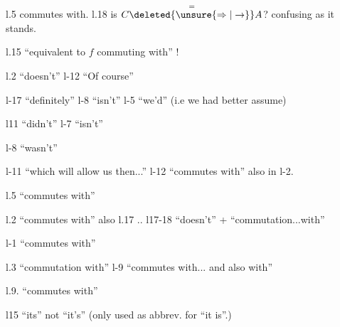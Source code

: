
\begin{minipage}{\linewidth}
\scriptsize
\setlength{\parindent}{0pt}
\setlength{\parskip}{1pt}

\noindent{}l.5 commutes with. l.18 is $C\overset{=}{\deleted{\unsure{\Rightarrow|\to}}}A$? confusing as it stands.

\noindent{}l.15 ``equivalent to $f$ commuting with'' !

\noindent{}l.2 ``doesn't'' l-12 ``Of course''

\noindent{}l-17 ``definitely'' l-8 ``isn't'' l-5 ``we'd'' (i.e we had better assume)

\noindent{}l11 ``didn't'' l-7 ``isn't''

\noindent{}l-8 ``wasn't''

\noindent{}l-11 ``which will allow us then...'' l-12 ``commutes with'' also in l-2.

\noindent{}l.5 ``commutes with''

\noindent{}l.2 ``commutes with'' also l.17 .. l17-18 ``doesn't'' + ``commutation...with''

\noindent l-1 ``commutes with''

\noindent{}l.3 ``commutation with'' l-9 ``commutes with... and also with''

\noindent{}l.9. ``commutes with''

\noindent{}l15 ``its'' not ``it's'' (only used as abbrev. for ``it is''.)


\end{minipage}

